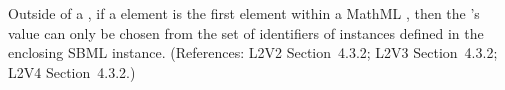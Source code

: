 Outside of a \FunctionDefinition, if a  element is the
first element within a MathML , then the 's
value can only be chosen from the set of identifiers of
\FunctionDefinition{} instances defined in the
enclosing SBML \Model instance.
(References: L2V2 Section~4.3.2; L2V3 Section~4.3.2; L2V4 Section~4.3.2.)
